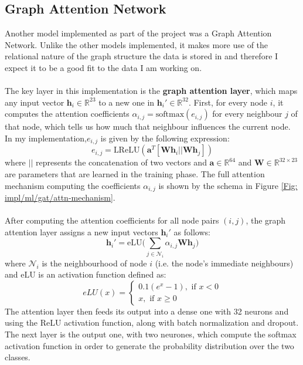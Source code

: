 	\subsection{Graph Attention Network} \label{Section: impl/ml/gat}
	Another model implemented as part of the project was a Graph Attention Network. Unlike the other models implemented, it makes more use of the relational nature of the graph structure the data is stored in and therefore I expect it to be a good fit to the data I am working on.
	\\ \\
	The key layer in this implementation is the \textbf{graph attention layer}, which maps any input vector $\mathbf{h}_i
	 \in \mathbb{R}^{23}$ to a new one in $\mathbf{h}_i'\in \mathbb{R}^{32}$. First, for every node $i$, it computes the attention coefficients $\alpha_{i,j} = \text{softmax}(e_{i,j})$ for every neighbour $j$ of that node, which tells us how much that neighbour influences the current node. In my implementation,$e_{i,j}$ is given by the following expression:
	\begin{equation}
		e_{i,j} = \text{LReLU}(\mathbf{a}^T[\mathbf{W}\mathbf{h}_i\vert\vert\mathbf{W}\mathbf{h}_j])
	\end{equation}
	where $\vert\vert$ represents the concatenation of two vectors and $\mathbf{a}\in\mathbb{R}^{64}$ and $\mathbf{W}\in\mathbb{R}^{32\times23}$ are parameters that are learned in the training phase. The full attention mechanism computing the coefficients $\alpha_{i,j}$ is shown by the schema in Figure \ref{Fig: impl/ml/gat/attn-mechanism}. 
	\\ \\
	After computing the attention coefficients for all node pairs $(i,j)$, the graph attention layer assigns a new input vectors $\mathbf{h}_i'$ as follows:
	\begin{equation}
		\mathbf{h}_i' = \text{eLU}\Bigg( \sum_{j \in \mathcal{N}_i} \alpha_{i,j} \mathbf{W} \mathbf{h}_j \Bigg)
	\end{equation}
	where $\mathcal{N}_i$ is the neighbourhood of node $i$ (i.e. the node's immediate neighbours) and $\text{eLU}$ is an activation function defined as:
	\begin{equation*}
		eLU(x) = 
			\begin{cases}
				0.1(e^x - 1), \text{ if } x < 0 \\
				x, \text{ if } x \geq 0
			\end{cases}
	\end{equation*}
	The attention layer then feeds its output into a dense one with 32 neurons and using the ReLU activation function, along with batch normalization and dropout. The next layer is the output one, with two neurones, which compute the softmax activation function in order to generate the probability distribution over the two classes.
